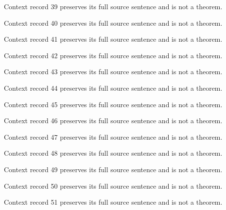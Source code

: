 \documentclass{article}
\begin{document}
\begin{remark}\label{train:context:39}Context record 39 preserves its full source sentence and is not a theorem.\end{remark}
\begin{remark}\label{train:context:40}Context record 40 preserves its full source sentence and is not a theorem.\end{remark}
\begin{remark}\label{train:context:41}Context record 41 preserves its full source sentence and is not a theorem.\end{remark}
\begin{remark}\label{train:context:42}Context record 42 preserves its full source sentence and is not a theorem.\end{remark}
\begin{remark}\label{train:context:43}Context record 43 preserves its full source sentence and is not a theorem.\end{remark}
\begin{remark}\label{train:context:44}Context record 44 preserves its full source sentence and is not a theorem.\end{remark}
\begin{remark}\label{train:context:45}Context record 45 preserves its full source sentence and is not a theorem.\end{remark}
\begin{remark}\label{train:context:46}Context record 46 preserves its full source sentence and is not a theorem.\end{remark}
\begin{remark}\label{train:context:47}Context record 47 preserves its full source sentence and is not a theorem.\end{remark}
\begin{remark}\label{train:context:48}Context record 48 preserves its full source sentence and is not a theorem.\end{remark}
\begin{remark}\label{train:context:49}Context record 49 preserves its full source sentence and is not a theorem.\end{remark}
\begin{remark}\label{train:context:50}Context record 50 preserves its full source sentence and is not a theorem.\end{remark}
\begin{remark}\label{train:context:51}Context record 51 preserves its full source sentence and is not a theorem.\end{remark}
\end{document}
